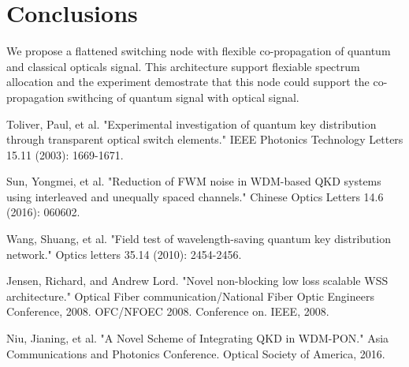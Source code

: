 \documentclass[letterpaper,10pt]{article}
\begin{document}
\section{Conclusions}
We propose a flattened switching node with flexible co-propagation of quantum and classical opticals signal. This architecture support flexiable spectrum allocation and the experiment demostrate that this node could support the co-propagation swithcing of quantum signal with optical signal.

\begin{thebibliography}{99}

 Toliver, Paul, et al. "Experimental investigation of quantum key distribution through transparent optical switch elements." IEEE Photonics Technology Letters 15.11 (2003): 1669-1671.

 Sun, Yongmei, et al. "Reduction of FWM noise in WDM-based QKD systems using interleaved and unequally spaced channels." Chinese Optics Letters 14.6 (2016): 060602.

 Wang, Shuang, et al. "Field test of wavelength-saving quantum key distribution network." Optics letters 35.14 (2010): 2454-2456.

 Jensen, Richard, and Andrew Lord. "Novel non-blocking low loss scalable WSS architecture." Optical Fiber communication/National Fiber Optic Engineers Conference, 2008. OFC/NFOEC 2008. Conference on. IEEE, 2008.

 Niu, Jianing, et al. "A Novel Scheme of Integrating QKD in WDM-PON." Asia Communications and Photonics Conference. Optical Society of America, 2016.

\end{thebibliography}
\end{document}
